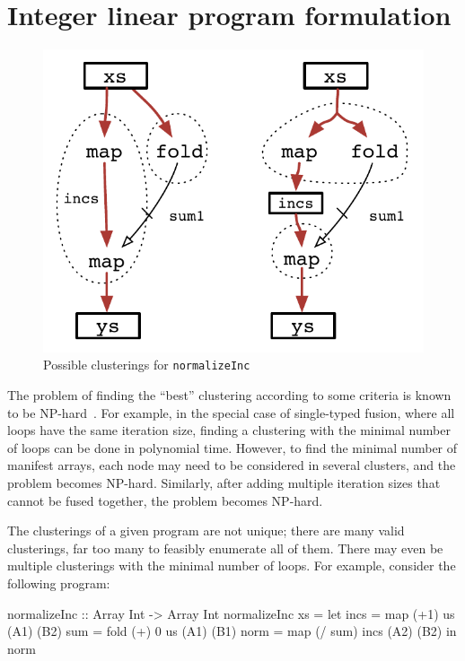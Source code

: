 \section{Integer linear program formulation}
\label{s:ILP}

\begin{figure}[ht!]
\begin{center}
\includegraphics[scale=0.5]{figures/ex2-normalizeInc.pdf}
\end{center}
\caption{Possible clusterings for \texttt{normalizeInc}}
\end{figure}

The problem of finding the ``best'' clustering according to some criteria is known to be NP-hard~\cite{darte1999complexity}.
For example, in the special case of single-typed fusion, where all loops have the same iteration size, finding a clustering with the minimal number of loops can be done in polynomial time.
However, to find the minimal number of manifest arrays, each node may need to be considered in several clusters, and the problem becomes NP-hard.
Similarly, after adding multiple iteration sizes that cannot be fused together, the problem becomes NP-hard.

The clusterings of a given program are not unique; there are many valid clusterings, far too many to feasibly enumerate all of them.
There may even be multiple clusterings with the minimal number of loops. For example, consider the following program:

\begin{code}
 normalizeInc :: Array Int -> Array Int
 normalizeInc xs
  = let incs = map  (+1)    us      (A1) (B2)
        sum  = fold (+) 0   us      (A1) (B1)
        norm = map  (/ sum) incs    (A2) (B2)
    in  norm
\end{code}

